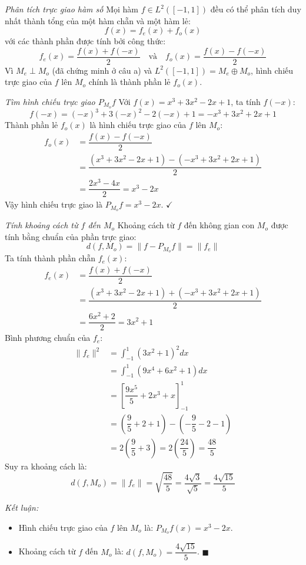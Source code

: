 \begin{solution}
\textit{Phân tích trực giao hàm số}
Mọi hàm $f \in L^2([-1, 1])$ đều có thể phân tích duy nhất thành tổng của một hàm chẵn và một hàm lẻ:
\[
    f(x) = f_e(x) + f_o(x)
\]
với các thành phần được tính bởi công thức:
\[
    f_e(x) = \dfrac{f(x) + f(-x)}{2} \quad \text{và} \quad f_o(x) = \dfrac{f(x) - f(-x)}{2}
\]
Vì $M_e \perp M_o$ (đã chứng minh ở câu a) và $L^2([-1,1]) = M_e \oplus M_o$, hình chiếu trực giao của $f$ lên $M_o$ chính là thành phần lẻ $f_o(x)$.

\textit{Tìm hình chiếu trực giao $P_{M_o}f$}
Với $f(x) = x^3 + 3x^2 - 2x + 1$, ta tính $f(-x)$:
\[ 
    f(-x) = (-x)^3 + 3(-x)^2 - 2(-x) + 1 = -x^3 + 3x^2 + 2x + 1 
\]
Thành phần lẻ $f_o(x)$ là hình chiếu trực giao của $f$ lên $M_o$:
\begin{align*}
    f_o(x) &= \dfrac{f(x) - f(-x)}{2} \\
    &= \dfrac{(x^3 + 3x^2 - 2x + 1) - (-x^3 + 3x^2 + 2x + 1)}{2} \\
    &= \dfrac{2x^3 - 4x}{2} = x^3 - 2x
\end{align*}
Vậy hình chiếu trực giao là $P_{M_o}f = x^3 - 2x$. $\checkmark$

\textit{Tính khoảng cách từ $f$ đến $M_o$}
Khoảng cách từ $f$ đến không gian con $M_o$ được tính bằng chuẩn của phần trực giao:
\[ 
    d(f, M_o) = \|f - P_{M_o}f\| = \|f_e\| 
\]
Ta tính thành phần chẵn $f_e(x)$:
\begin{align*}
    f_e(x) &= \dfrac{f(x) + f(-x)}{2} \\
    &= \dfrac{(x^3 + 3x^2 - 2x + 1) + (-x^3 + 3x^2 + 2x + 1)}{2} \\
    &= \dfrac{6x^2 + 2}{2} = 3x^2 + 1
\end{align*}
Bình phương chuẩn của $f_e$:
\begin{align*}
    \|f_e\|^2 &= \int_{-1}^1 (3x^2 + 1)^2 dx \\
    &= \int_{-1}^1 (9x^4 + 6x^2 + 1) dx \\
    &= \left[ \dfrac{9x^5}{5} + 2x^3 + x \right]_{-1}^1 \\
    &= \left( \dfrac{9}{5} + 2 + 1 \right) - \left( -\dfrac{9}{5} - 2 - 1 \right) \\
    &= 2 \left( \dfrac{9}{5} + 3 \right) = 2 \left( \dfrac{24}{5} \right) = \dfrac{48}{5}
\end{align*}
Suy ra khoảng cách là:
\[
    d(f, M_o) = \|f_e\| = \sqrt{\dfrac{48}{5}} = \dfrac{4\sqrt{3}}{\sqrt{5}} = \dfrac{4\sqrt{15}}{5}
\]

\textit{Kết luận:}
\begin{itemize}
    \item Hình chiếu trực giao của $f$ lên $M_o$ là: $P_{M_o}f(x) = x^3 - 2x$.
    \item Khoảng cách từ $f$ đến $M_o$ là: $d(f, M_o) = \dfrac{4\sqrt{15}}{5}$. $\blacksquare$
\end{itemize}
\end{solution}

\newpage